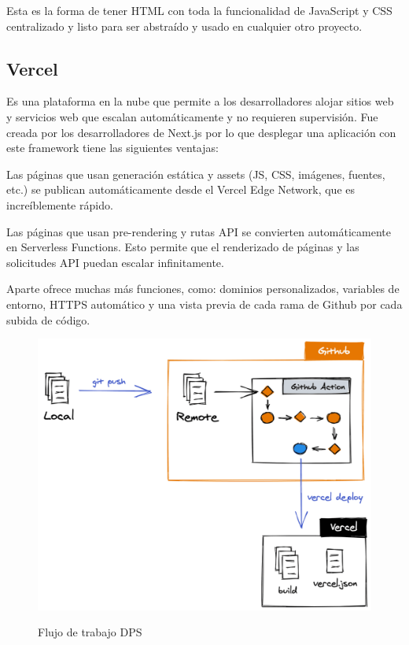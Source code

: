 \documentclass[12pt,twoside,titlepage]{report}
\begin{document}
Esta es la forma de tener HTML con toda la funcionalidad de JavaScript y CSS centralizado y listo para ser abstraído y usado en cualquier otro proyecto.

\subsection{Vercel}

Es una plataforma en la nube que permite a los desarrolladores alojar sitios web y servicios web que escalan automáticamente y no requieren supervisión. Fue creada por los desarrolladores de Next.js por lo que desplegar una aplicación con este framework tiene las siguientes ventajas:

\begin{compactitem}
    \item Las páginas que usan generación estática y assets (JS, CSS, imágenes, fuentes, etc.) se publican automáticamente desde el Vercel Edge Network, que es increíblemente rápido.
    \item Las páginas que usan pre-rendering y rutas API se convierten automáticamente en Serverless Functions. Esto permite que el renderizado de páginas y las solicitudes API puedan escalar infinitamente.
\end{compactitem}

Aparte ofrece muchas más funciones, como: dominios personalizados, variables de entorno, HTTPS automático y una vista previa de cada rama de Github por cada subida de código.

\begin{figure}[H]
    \centering
    \includegraphics[scale=0.2]{Vercel/DPS}
    \label{fig:vercel_workflow}
    \caption{Flujo de trabajo DPS}
\end{figure}
\end{document}
